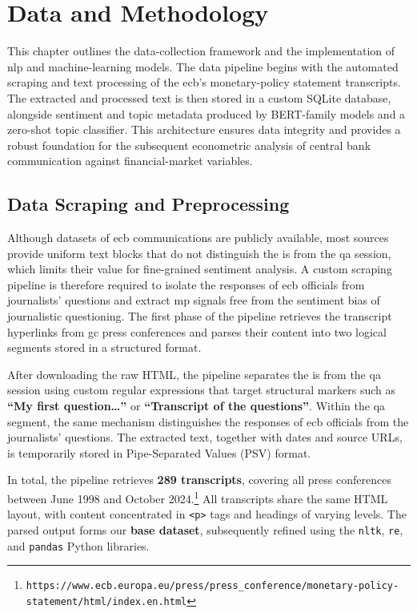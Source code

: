 \chapter{Data and Methodology}\label{ch:data}
\label{ch:methodology}
This chapter outlines the data-collection framework and the implementation of \gls{nlp} and machine-learning models. The data pipeline begins with the automated scraping and text processing of the \gls{ecb}'s monetary-policy statement transcripts. The extracted and processed text is then stored in a custom SQLite database, alongside sentiment and topic metadata produced by BERT-family models and a zero-shot topic classifier. This architecture ensures data integrity and provides a robust foundation for the subsequent econometric analysis of central bank communication against financial-market variables.

\section{Data Scraping and Preprocessing}
\label{sec:scraping}

Although datasets of \gls{ecb} communications are publicly available, most sources provide uniform text blocks that do not distinguish the \gls{is} from the \gls{qa} session, which limits their value for fine-grained sentiment analysis. A custom scraping pipeline is therefore required to isolate the responses of \gls{ecb} officials from journalists' questions and extract
\gls{mp} signals free from the sentiment bias of journalistic questioning. The first phase of the pipeline retrieves the transcript hyperlinks from
\gls{gc} press conferences and parses their content into two logical segments stored in a structured format.

After downloading the raw HTML, the pipeline separates the \gls{is} from the
\gls{qa} session using custom regular expressions that target structural markers such as \textbf{``My first question\ldots''} or \textbf{``Transcript of the questions''}. Within the \gls{qa} segment, the same mechanism distinguishes the responses of \gls{ecb} officials from the journalists' questions. The extracted text, together with dates and source URLs, is temporarily stored in Pipe-Separated Values (PSV) format.

In total, the pipeline retrieves \textbf{289 transcripts}, covering all press conferences between June 1998 and October 2024.\footnote{\nolinkurl{https://www.ecb.europa.eu/press/press_conference/monetary-policy-statement/html/index.en.html}} All transcripts share the same HTML layout, with content concentrated in \texttt{<p>} tags and headings of varying levels. The parsed output forms our \textbf{base dataset}, subsequently refined using the \texttt{nltk}, \texttt{re}, and \texttt{pandas} Python libraries.

